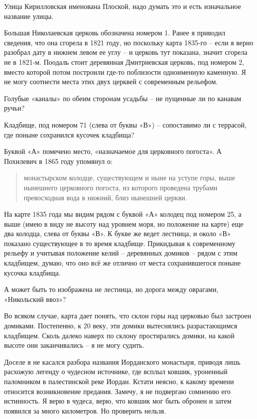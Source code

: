 Улица Кирилловская именована Плоской, надо думать это и есть изначальное название улицы.

Большая Николаевская церковь обозначена номером 1. Ранее я приводил сведения, что она сгорела в 1821 году, но поскольку карта 1835-го – если я верно разобрал дату в нижнем левом ее углу – и церковь тут показана, значит сгорела не в 1821-м. Поодаль стоит деревянная Дмитриевская церковь, под номером 2, вместо которой потом построили где-то поблизости одноименную каменную. Я не могу соотнести места этих двух церквей с современным рельефом.

Голубые «каналы» по обеим сторонам усадьбы – не пущенные ли по канавам ручьи?

Кладбище, под номером 71 (слева от буквы «В») – сопоставимо ли с террасой, где поныне сохранился кусочек кладбища?

Буквой «А» помечено место, «назначаемое для церковного погоста». А Похилевич в 1865 году упомянул о:

\begin{quotation}
монастырском колодце, существующем и ныне на уступе горы, выше нынешнего церковного погоста, из которого проведена трубами превосходная вода в нижний, близ нынешней церкви.
\end{quotation}

На карте 1835 года мы видим рядом с буквой «А» колодец под номером 25, а выше (имею в виду не высоту над уровнем моря, но положение на карте) еще два колодца, слева от буквы «В». К букве же ведет лестница, и около «В» показано существующее в то время кладбище. Прикидывая к современному рельефу и учитывая положение келий – деревянных домиков – рядом с этим кладбищем, думаю, что оно всё же отлично от места сохранившегося поныне кусочка кладбища.

А может быть то изображена не лестница, но дорога между оврагами, «Никольский ввоз»?

Во всяком случае, карта дает понять, что склон горы над церковью был застроен домиками. Постепенно, к 20 веку, эти домики вытеснялись разрастающимся кладбищем. Сколь далеко наверх по склону простирались домики, на какой высоте они заканчивались – я не могу судить.

Доселе я не касался разбора названия Иорданского монастыря, приводя лишь расхожую легенду о чудесном источнике, где всплыл ковшик, уроненный паломником в палестинской реке Иордан. Кстати неясно, к какому времени относится возникновение предания. Замечу, я не подвергаю сомнению его истинность. Я верю в чудеса, верю, что ковшик мог быть обронен и затем появился за много километров. Но проверить нельзя. 

